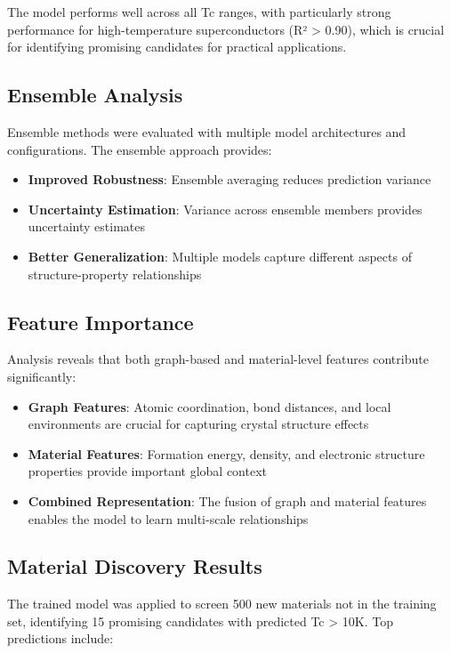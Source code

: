 \documentclass[11pt,a4paper]{article}
\begin{document}
The model performs well across all Tc ranges, with particularly strong performance for high-temperature superconductors (R² > 0.90), which is crucial for identifying promising candidates for practical applications.

\subsection{Ensemble Analysis}

Ensemble methods were evaluated with multiple model architectures and configurations. The ensemble approach provides:

\begin{itemize}
    \item \textbf{Improved Robustness}: Ensemble averaging reduces prediction variance
    \item \textbf{Uncertainty Estimation}: Variance across ensemble members provides uncertainty estimates
    \item \textbf{Better Generalization}: Multiple models capture different aspects of structure-property relationships
\end{itemize}

\subsection{Feature Importance}

Analysis reveals that both graph-based and material-level features contribute significantly:

\begin{itemize}
    \item \textbf{Graph Features}: Atomic coordination, bond distances, and local environments are crucial for capturing crystal structure effects
    \item \textbf{Material Features}: Formation energy, density, and electronic structure properties provide important global context
    \item \textbf{Combined Representation}: The fusion of graph and material features enables the model to learn multi-scale relationships
\end{itemize}

\subsection{Material Discovery Results}

The trained model was applied to screen 500 new materials not in the training set, identifying 15 promising candidates with predicted Tc > 10K. Top predictions include:
\end{document}
